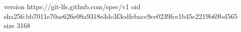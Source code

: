 version https://git-lfs.github.com/spec/v1
oid sha256:bb7011e70ae626e08a9318e3dc3f3cdfebacc9ce0239fce1b45c2219b69bd565
size 3168
